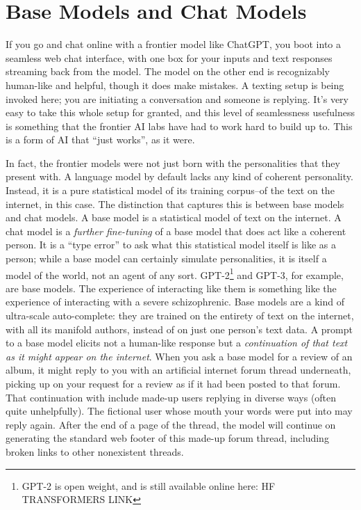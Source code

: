 \section{Base Models and Chat Models}
If you go and chat online with a frontier model like ChatGPT, you boot into a
seamless web chat interface, with one box for your inputs and text responses
streaming back from the model. The model on the other end is recognizably
human-like and helpful, though it does make mistakes. A texting setup is being
invoked here; you are initiating a conversation and someone is replying. It's
very easy to take this whole setup for granted, and this level of seamlessness
usefulness is something that the frontier AI labs have had to work hard to
build up to. This is a form of AI that ``just works'', as it were.

In fact, the frontier models were not just born with the personalities that
they present with. A language model by default lacks any kind of coherent
personality. Instead, it is a pure statistical model of its training corpus--of
the text on the internet, in this case. The distinction that captures this is
between base models and chat models. A base model is a statistical model of
text on the internet. A chat model is a \emph{further fine-tuning} of a base
model that does act like a coherent person. It is a ``type error'' to ask what
this statistical model itself is like as a person; while a base model can
certainly simulate personalities, it is itself a model of the world, not an
agent of any sort. GPT-2\footnote{GPT-2 is open weight, and is still available
online here: HF TRANSFORMERS LINK} and GPT-3, for example, are base models. The
experience of interacting like them is something like the experience of
interacting with a severe schizophrenic. Base models are a kind of ultra-scale
auto-complete: they are trained on the entirety of text on the internet, with
all its manifold authors, instead of on just one person's text data. A prompt
to a base model elicits not a human-like response but a \emph{continuation of
that text as it might appear on the internet}. When you ask a base model for a
review of an album, it might reply to you with an artificial internet forum
thread underneath, picking up on your request for a review as if it had been
posted to that forum. That continuation with include made-up users replying in
diverse ways (often quite unhelpfully). The fictional user whose mouth your
words were put into may reply again. After the end of a page of the thread, the
model will continue on generating the standard web footer of this made-up forum
thread, including broken links to other nonexistent threads.

